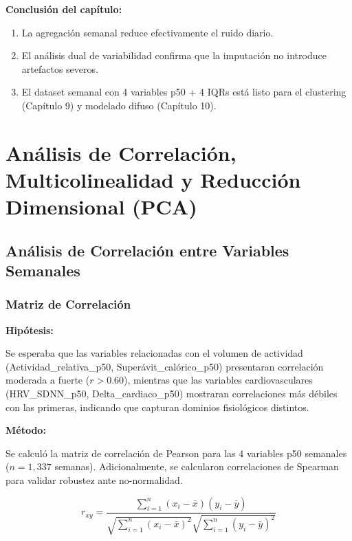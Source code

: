 \documentclass[12pt,letterpaper,twoside]{report}
\begin{document}
\begin{conclusionbox}
\textbf{Conclusión del capítulo:}

\begin{enumerate}[noitemsep]
    \item La agregación semanal reduce efectivamente el ruido diario.
    \item El análisis dual de variabilidad confirma que la imputación no introduce artefactos severos.
    \item El dataset semanal con 4 variables p50 + 4 IQRs está listo para el clustering (Capítulo 9) y modelado difuso (Capítulo 10).
\end{enumerate}
\end{conclusionbox}

\chapter{Análisis de Correlación, Multicolinealidad y Reducción Dimensional (PCA)}

\section{Análisis de Correlación entre Variables Semanales}

\subsection{Matriz de Correlación}

\begin{hipotesisbox}
\textbf{Hipótesis:}

Se esperaba que las variables relacionadas con el volumen de actividad (Actividad\_relativa\_p50, Superávit\_calórico\_p50) presentaran correlación moderada a fuerte ($r > 0.60$), mientras que las variables cardiovasculares (HRV\_SDNN\_p50, Delta\_cardiaco\_p50) mostraran correlaciones más débiles con las primeras, indicando que capturan dominios fisiológicos distintos.
\end{hipotesisbox}

\begin{estadisticobox}
\textbf{Método:}

Se calculó la matriz de correlación de Pearson para las 4 variables p50 semanales ($n=1,337$ semanas). Adicionalmente, se calcularon correlaciones de Spearman para validar robustez ante no-normalidad.

\begin{equation}
r_{xy} = \frac{\sum_{i=1}^{n}(x_i - \bar{x})(y_i - \bar{y})}{\sqrt{\sum_{i=1}^{n}(x_i - \bar{x})^2}\sqrt{\sum_{i=1}^{n}(y_i - \bar{y})^2}}
\end{equation}
\end{estadisticobox}
\end{document}
